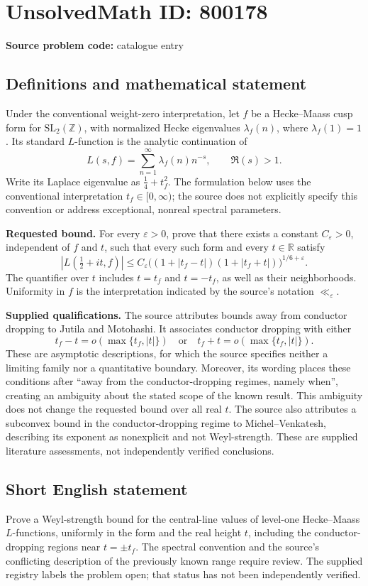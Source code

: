 \documentclass[11pt]{article}
\newcommand{\Z}{\mathbb{Z}}
\newcommand{\R}{\mathbb{R}}
\begin{document}
\section*{UnsolvedMath ID: 800178}
\textbf{Source problem code:} catalogue entry
\subsection{Definitions and mathematical statement}
Under the conventional weight-zero interpretation, let \(f\) be a Hecke--Maass cusp form for \(\mathrm{SL}_2(\Z)\), with normalized Hecke eigenvalues \(\lambda_f(n)\), where \(\lambda_f(1)=1\). Its standard \(L\)-function is the analytic continuation of
\[
L(s,f)=\sum_{n=1}^{\infty}\lambda_f(n)n^{-s},\qquad \Re(s)>1.
\]
Write its Laplace eigenvalue as \(\tfrac14+t_f^2\). The formulation below uses the conventional interpretation \(t_f\in[0,\infty)\); the source does not explicitly specify this convention or address exceptional, nonreal spectral parameters.

\textbf{Requested bound.} For every \(\varepsilon>0\), prove that there exists a constant \(C_{\varepsilon}>0\), independent of \(f\) and \(t\), such that every such form and every \(t\in\R\) satisfy
\[
\left|L\!\left(\tfrac12+it,f\right)\right|
\le C_{\varepsilon}
\bigl((1+|t_f-t|)(1+|t_f+t|)\bigr)^{1/6+\varepsilon}.
\]
The quantifier over \(t\) includes \(t=t_f\) and \(t=-t_f\), as well as their neighborhoods. Uniformity in \(f\) is the interpretation indicated by the source's notation \(\ll_{\varepsilon}\).

\textbf{Supplied qualifications.} The source attributes bounds away from conductor dropping to Jutila and Motohashi. It associates conductor dropping with either
\[
t_f-t=o\!\left(\max\{t_f,|t|\}\right)
\quad\text{or}\quad
t_f+t=o\!\left(\max\{t_f,|t|\}\right).
\]
These are asymptotic descriptions, for which the source specifies neither a limiting family nor a quantitative boundary. Moreover, its wording places these conditions after ``away from the conductor-dropping regimes, namely when'', creating an ambiguity about the stated scope of the known result. This ambiguity does not change the requested bound over all real \(t\). The source also attributes a subconvex bound in the conductor-dropping regime to Michel--Venkatesh, describing its exponent as nonexplicit and not Weyl-strength. These are supplied literature assessments, not independently verified conclusions.
\subsection{Short English statement}
Prove a Weyl-strength bound for the central-line values of level-one Hecke--Maass \(L\)-functions, uniformly in the form and the real height \(t\), including the conductor-dropping regions near \(t=\pm t_f\). The spectral convention and the source's conflicting description of the previously known range require review. The supplied registry labels the problem open; that status has not been independently verified.
\end{document}
